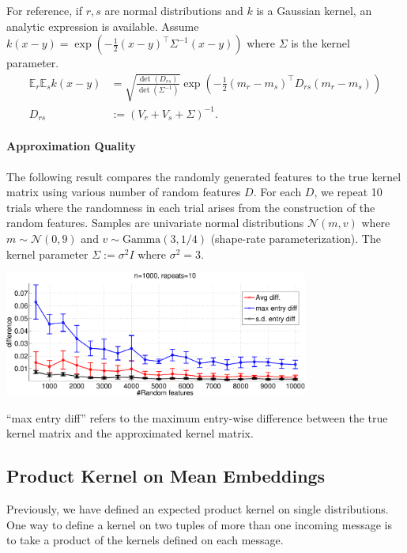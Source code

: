 \documentclass[english]{article}
\theoremstyle{plain}
\theoremstyle{plain}
\begin{document}
For reference, if $r, s$ are normal distributions and $k$
is a Gaussian kernel, an analytic expression is available. Assume
$k(x-y)=\exp\left(-\frac{1}{2}\left(x-y\right)^{\top}\Sigma^{-1}\left(x-y\right)\right)$
where $\Sigma$ is the kernel parameter.
\begin{align*}
\mathbb{E}_{r}\mathbb{E}_{s}k(x-y) & =\sqrt{\frac{\det(D_{rs})}{\det(\Sigma^{-1})}}\exp\left(-\frac{1}{2}\left(m_{r}-m_{s}\right)^{\top}D_{rs}\left(m_{r}-m_{s}\right)\right)\\
D_{rs} & :=\left(V_{r}+V_{s}+\Sigma\right)^{-1}.
\end{align*}

\paragraph{Approximation Quality}

{} The following result compares the randomly generated features to
the true kernel matrix using various number of random features $D$. 
For each $D$, we repeat 10 trials where the randomness in each trial 
arises from the construction of the random features. 
Samples are univariate normal distributions $\mathcal{N}(m, v)$ where 
$m \sim \mathcal{N}(0, 9)$ and $v \sim \text{Gamma}(3, 1/4)$ (shape-rate 
parameterization). The kernel parameter $\Sigma:=\sigma^2 I$ where $\sigma^2=3$.

\includegraphics[width=10cm]{img/primal_egauss_sanity-crop}

``max entry diff''
refers to the maximum entry-wise difference between the true kernel
matrix and the approximated kernel matrix.

\subsection{Product Kernel on Mean Embeddings}
Previously, we have defined an expected product kernel on single distributions.
One way to define a kernel on two tuples of more than one incoming message is to take 
a product of the kernels defined on each message.
\end{document}

